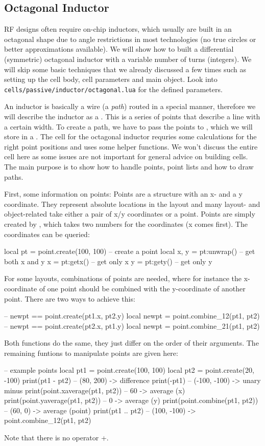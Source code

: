 \subsection{Octagonal Inductor}
RF designs often require on-chip inductors, which usually are built in an octagonal shape due to angle restrictions in most technologies (no true circles or
better approximations available).
We will show how to built a differential (symmetric) octagonal inductor with a variable number of turns (integers).
We will skip some basic techniques that we already discussed a few times such as setting up the cell body, cell parameters and main object.
Look into \texttt{cells/passive/inductor/octagonal.lua} for the defined parameters.

An inductor is basically a wire (a \emph{path}) routed in a special manner, therefore we will describe the inductor as a .
This is a series of points that describe a line with a certain width.
To create a path, we have to pass the points to , which we will store in a .
The cell for the octagonal inductor requries some calculations for the right point positions and uses some helper functions.
We won't discuss the entire cell here as some issues are not important for general advice on building cells.
The main purpose is to show how to handle points, point lists and how to draw paths.

First, some information on points:
Points are a structure with an x- and a y coordinate.
They represent absolute locations in the layout and many layout- and object-related take either a pair of x/y coordinates or a point.
Points are simply created by , which takes two numbers for the coordinates (x comes first).
The coordinates can be queried:
\begin{lualisting}
    local pt = point.create(100, 100) -- create a point
    local x, y = pt:unwrap() -- get both x and y
    x = pt:getx() -- get only x
    y = pt:gety() -- get only y
\end{lualisting}
For some layouts, combinations of points are needed, where for instance the x-coordinate of one point should be combined with the y-coordinate of another point.
There are two ways to achieve this:
\begin{lualisting}
    -- newpt == point.create(pt1.x, pt2.y)
    local newpt = point.combine_12(pt1, pt2)
    -- newpt == point.create(pt2.x, pt1.y)
    local newpt = point.combine_21(pt1, pt2)
\end{lualisting}
Both functions do the same, they just differ on the order of their arguments.
The remaining funtions to manipulate points are given here:
\begin{lualisting}
    -- example points
    local pt1 = point.create(100, 100)
    local pt2 = point.create(20, -100)
    print(pt1 - pt2)  -- (80, 200)    -> difference
    print(-pt1)       -- (-100, -100) -> unary minus
    print(point.xaverage(pt1, pt2)) -- 60 -> average (x)
    print(point.yaverage(pt1, pt2)) -- 0 -> average (y)
    print(point.combine(pt1, pt2)) -- (60, 0) -> average (point)
    print(pt1 .. pt2) -- (100, -100)  -> point.combine_12(pt1, pt2)
\end{lualisting}
Note that there is no operator +.

